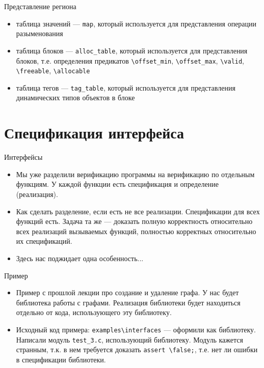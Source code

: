\documentclass[hyperref={unicode=true}]{beamer}
\begin{document}
    \begin{frame}{Представление региона}
    \begin{itemize}
    \item таблица значений  --- \texttt{map}, который используется для представления операции разыменования
    \item таблица блоков  --- \texttt{alloc\_table}, который используется для представления блоков, т.е. определения предикатов \texttt{\textbackslash offset\_min},
     \texttt{\textbackslash offset\_max}, \texttt{\textbackslash valid}, \texttt{\textbackslash freeable}, \texttt{\textbackslash allocable}
    \item таблица тегов --- \texttt{tag\_table}, который используется для представления динамических типов объектов в блоке
    \end{itemize}
    \end{frame}

    \section{Спецификация интерфейса}

    \begin{frame}{Интерфейсы}
    \begin{itemize}
    \item Мы уже разделили верификацию программы на верификацию по отдельным функциям. У каждой функции есть спецификация и определение (реализация).
    \item Как сделать разделение, если есть не все реализации. Спецификации для всех функций есть. Задача та же --- доказать полную корректность
    относительно всех реализаций вызываемых функций, полностью корректных относительно их спецификаций.
    \item Здесь нас поджидает одна особенность...
    \end{itemize}
    \end{frame}

    \begin{frame}{Пример}
    \begin{itemize}
    \item Пример с прошлой лекции про создание и удаление графа. У нас будет библиотека работы с графами. Реализация библиотеки будет
    находиться отдельно от кода, использующего эту библиотеку.
    \item Исходный код примера: \texttt{examples\textbackslash interfaces} --- оформили как библиотеку. Написали модуль \texttt{test\_3.c}, использующий библиотеку.
    Модуль кажется странным, т.к. в нем требуется доказать \texttt{assert \textbackslash false;}, т.е. нет ли ошибки в спецификации библиотеки.
    \end{itemize}
    \end{frame}
\end{document}
